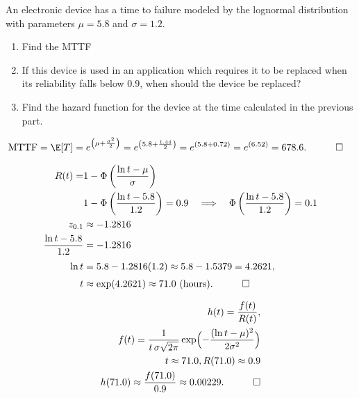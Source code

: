 \begin{hwkProblem}{8}{}

	An electronic device has a time to failure modeled by the lognormal distribution with parameters \( \mu = 5.8 \) and \( \sigma = 1.2 \).
	\begin{enumerate}
		\item Find the MTTF
		\item If this device is used in an application which requires it to be replaced when its reliability falls below \( 0.9 \), when should the device be replaced?
		\item Find the hazard function for the device at the time calculated in the previous part.
	\end{enumerate}

	\hwkSol

	\hwkPart
	\begin{align*}
		\text{MTTF} &= \E[T]
		=e^{\left(\mu+\frac{\sigma^2}{2}\right)}
		=e^{\left(5.8+\frac{1.44}{2}\right)}
		=e^{\left(5.8+0.72\right)}
		=e^{\left(6.52\right)}=678.6. \quad \qed
	\end{align*}

	\hwkPart
	\begin{align*}
		R(t)=&1-\Phi\left(\frac{\ln t-\mu}{\sigma}\right) \\
		     &1-\Phi\left(\frac{\ln t-5.8}{1.2}\right)=0.9 \quad \Longrightarrow \quad \Phi\left(\frac{\ln t-5.8}{1.2}\right)=0.1 \\
		z_{0.1}&\approx -1.2816 \\
		\frac{\ln t-5.8}{1.2}&=-1.2816\\[1mm]
		\ln t&= 5.8-1.2816(1.2)
		\approx 5.8-1.5379=4.2621,\\[1mm]
		t&\approx \exp(4.2621)\approx 71.0\ \text{(hours)}. \quad \qed
	\end{align*}

	\hwkPart
	\begin{align*}
		h(t)=\frac{f(t)}{R(t)}, \\
		f(t)= \frac{1}{t\,\sigma\sqrt{2\pi}}
		\exp\Bigl(-\frac{(\ln t-\mu)^2}{2\sigma^2}\Bigr) \\
		t\approx 71.0, R(71.0)\approx 0.9 \\
		h(71.0)\approx \frac{f(71.0)}{0.9}\approx 0.00229. \quad \qed
	\end{align*}
\end{hwkProblem}


